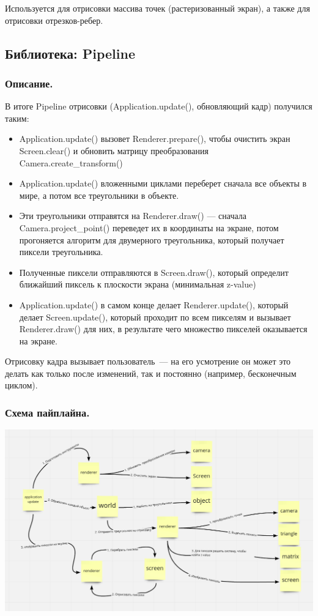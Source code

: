 \documentclass{article}
\begin{document}
Используется для отрисовки массива точек (растеризованный экран), а также для отрисовки отрезков-ребер.


\newpage
\subsection{Библиотека: Pipeline}

\subsubsection{Описание.}

В итоге Pipeline отрисовки (Application.update(), обновляющий кадр) получился таким:

\begin{itemize}

\item Application.update() вызовет Renderer.prepare(), чтобы очистить экран Screen.clear() и обновить матрицу преобразования Camera.create\_transform()
\item Application.update() вложенными циклами переберет сначала все объекты в мире, а потом все треугольники в объекте.
\item Эти треугольники отправятся на Renderer.draw() --- сначала Camera.project\_point() переведет их в координаты на экране, потом прогоняется алгоритм для двумерного треугольника, который получает пиксели треугольника.
\item Полученные пиксели отправляются в Screen.draw(), который определит ближайший пиксель к плоскости экрана (минимальная z-value)
\item Application.update() в самом конце делает Renderer.update(), который делает Screen.update(), который проходит по всем пикселям и вызывает Renderer.draw() для них, в результате чего множество пикселей оказывается на экране.
\end{itemize}

Отрисовку кадра вызывает пользователь~--- на его усмотрение он может это делать как только после изменений, так и постоянно (например, бесконечным циклом).

\subsubsection{Схема пайплайна.}

\begin{center}
\includegraphics[width=15cm]{scheme_pipeline.png}
\end{center}
\end{document}
